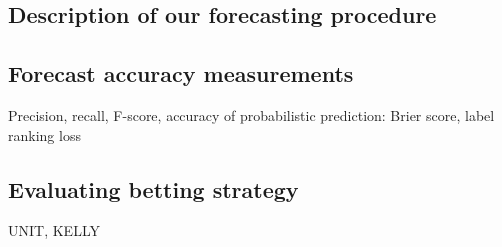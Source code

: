 \subsection{Description of our forecasting procedure}
\subsection{Forecast accuracy measurements}
Precision, recall, F-score, accuracy of probabilistic prediction: Brier score, label ranking loss
\subsection{Evaluating betting strategy}
UNIT, KELLY




